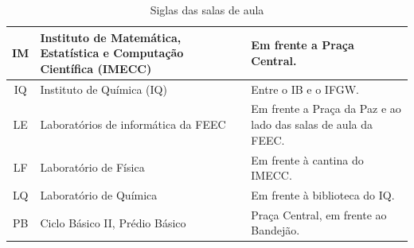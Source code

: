 \begin{table}[ht!]
\begin{tabular}{|c|p{}|p{}|}
        IM  &  Instituto de Matemática, Estatística e Computação Científica (IMECC)  &  Em frente a Praça Central.\\ \hline

        IQ  &  Instituto de Química (IQ)  &  Entre o IB e o IFGW.\\ \hline

        LE  &  Laboratórios de informática da FEEC  &  Em frente a Praça da Paz e ao lado das salas de aula da FEEC.\\ \hline

        LF  &  Laboratório de Física  &  Em frente à cantina do IMECC.\\ \hline

        LQ  &  Laboratório de Química  &  Em frente à biblioteca do IQ.\\ \hline

        PB  &  Ciclo Básico II, Prédio Básico  &  Praça Central, em frente ao Bandejão.\\ \hline
    \end{tabular}
    \caption{Siglas das salas de aula}
    \label{tab:institutos}
\end{table}
